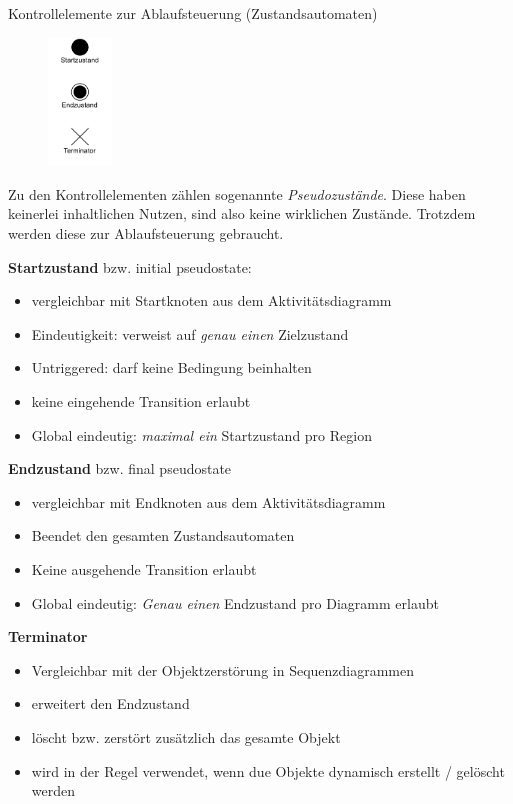 \begin{diag}{Kontrollelemente zur Ablaufsteuerung (Zustandsautomaten)}
    \begin{figure}
        \centering
        \includegraphics[width=0.15\textwidth]{includes/figures/defi_diagrams_state_start.pdf}
    \end{figure}
    Zu den Kontrollelementen zählen sogenannte \emph{Pseudozustände}.
    Diese haben keinerlei inhaltlichen Nutzen, sind also keine wirklichen Zustände.
    Trotzdem werden diese zur Ablaufsteuerung gebraucht.

    \textbf{Startzustand} bzw. initial pseudostate:
    \begin{itemize}
        \item vergleichbar mit Startknoten aus dem Aktivitätsdiagramm
        \item Eindeutigkeit: verweist auf \emph{genau einen} Zielzustand
        \item Untriggered: darf keine Bedingung beinhalten
        \item keine eingehende Transition erlaubt
        \item Global eindeutig: \emph{maximal ein} Startzustand pro Region
    \end{itemize}

    \textbf{Endzustand} bzw. final pseudostate
    \begin{itemize}
        \item vergleichbar mit Endknoten aus dem Aktivitätsdiagramm
        \item Beendet den gesamten Zustandsautomaten
        \item Keine ausgehende Transition erlaubt
        \item Global eindeutig: \emph{Genau einen} Endzustand pro Diagramm erlaubt
    \end{itemize}

    \textbf{Terminator}
    \begin{itemize}
        \item Vergleichbar mit der Objektzerstörung in Sequenzdiagrammen
        \item erweitert den Endzustand
        \item löscht bzw. zerstört zusätzlich das gesamte Objekt
        \item wird in der Regel verwendet, wenn due Objekte dynamisch erstellt / gelöscht werden
    \end{itemize}
\end{diag}

